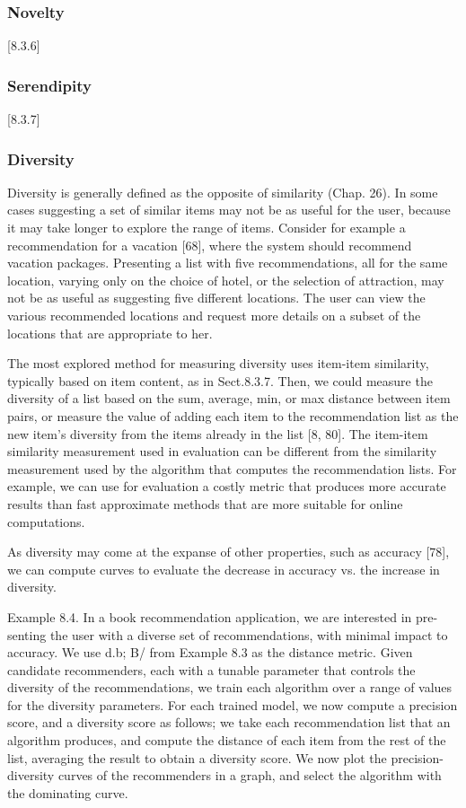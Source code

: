 \subsubsection{Novelty}
[8.3.6]

\subsubsection{Serendipity}
[8.3.7]

\subsubsection{Diversity}

Diversity is generally defined as the opposite of similarity (Chap. 26). In some cases suggesting a set of similar items may not be as useful for the user, because it may take longer to explore the range of items. Consider for example a recommendation for a vacation [68], where the system should recommend vacation packages. Presenting a list with five recommendations, all for the same location, varying only on the choice of hotel, or the selection of attraction, may not be as useful as suggesting five different locations. The user can view the various recommended locations and request more details on a subset of the locations that are appropriate to her.

The most explored method for measuring diversity uses item-item similarity, typically based on item content, as in Sect.8.3.7. Then, we could measure the diversity of a list based on the sum, average, min, or max distance between item pairs, or measure the value of adding each item to the recommendation list as the new item’s diversity from the items already in the list [8, 80]. The item-item similarity measurement used in evaluation can be different from the similarity measurement used by the algorithm that computes the recommendation lists. For example, we can use for evaluation a costly metric that produces more accurate results than fast approximate methods that are more suitable for online computations.

As diversity may come at the expanse of other properties, such as accuracy [78], we can compute curves to evaluate the decrease in accuracy vs. the increase in diversity.

Example 8.4. In a book recommendation application, we are interested in pre- senting the user with a diverse set of recommendations, with minimal impact to accuracy. We use d.b; B/ from Example 8.3 as the distance metric. Given candidate recommenders, each with a tunable parameter that controls the diversity of the recommendations, we train each algorithm over a range of values for the diversity parameters. For each trained model, we now compute a precision score, and a diversity score as follows; we take each recommendation list that an algorithm produces, and compute the distance of each item from the rest of the list, averaging the result to obtain a diversity score. We now plot the precision-diversity curves of the recommenders in a graph, and select the algorithm with the dominating curve.

